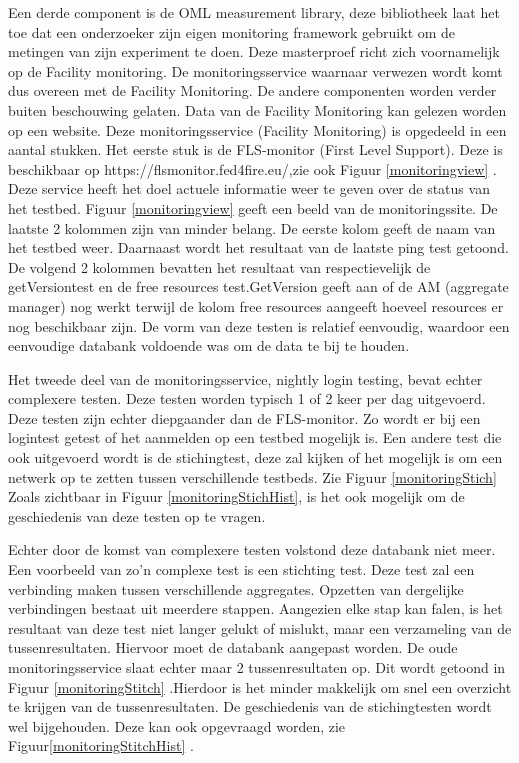 \npar
Een derde component is de OML measurement library, deze bibliotheek laat het toe dat een onderzoeker zijn eigen monitoring framework gebruikt om de metingen van zijn experiment te doen.
\npar
Deze masterproef richt zich voornamelijk op de Facility monitoring. De monitoringsservice waarnaar verwezen wordt komt dus overeen met de Facility Monitoring. De andere componenten worden verder buiten beschouwing gelaten.
Data van de Facility Monitoring kan gelezen worden op een website.
\npar
Deze monitoringsservice (Facility Monitoring) is opgedeeld in een aantal stukken. Het eerste stuk is de FLS-monitor (First Level Support). Deze is beschikbaar op https://flsmonitor.fed4fire.eu/,zie ook Figuur \ref{monitoringview} . Deze service heeft het doel actuele informatie weer te geven over de status van het testbed.
\npar
Figuur \ref{monitoringview} geeft een beeld van de monitoringssite. De laatste 2 kolommen zijn van minder belang. De eerste kolom geeft de naam van het testbed weer. Daarnaast wordt het resultaat van de laatste ping test getoond. De volgend 2 kolommen bevatten het resultaat van respectievelijk de getVersiontest en de free resources test.GetVersion geeft aan of de AM (aggregate manager) nog werkt terwijl de kolom free resources aangeeft hoeveel resources er nog beschikbaar zijn. De vorm van deze testen is relatief eenvoudig, waardoor een eenvoudige databank voldoende was om de data te bij te houden. 

\clearpage
\npar
Het tweede deel van de monitoringsservice, nightly login testing, bevat echter complexere testen. Deze testen worden typisch 1 of 2 keer per dag uitgevoerd. Deze testen zijn echter diepgaander dan de FLS-monitor. Zo wordt er bij een logintest getest of het aanmelden op een testbed mogelijk is. Een andere test die ook uitgevoerd wordt is de stichingtest, deze zal kijken of het mogelijk is om een netwerk op te zetten tussen verschillende testbeds. Zie Figuur \ref{monitoringStich}
Zoals zichtbaar in Figuur \ref{monitoringStichHist}, is het ook mogelijk om de geschiedenis van deze testen op te vragen. 
\clearpage




\npar
Echter door de komst van complexere testen volstond deze databank niet meer. Een voorbeeld van zo'n complexe test is een stichting test. Deze test zal een verbinding maken tussen verschillende aggregates. Opzetten van dergelijke verbindingen bestaat uit meerdere stappen. Aangezien elke stap kan falen, is het resultaat van deze test niet langer gelukt of mislukt, maar een verzameling van de tussenresultaten. Hiervoor moet de databank aangepast worden. De oude monitoringsservice slaat echter maar 2 tussenresultaten op. Dit wordt getoond in Figuur \ref{monitoringStitch} .Hierdoor is het minder makkelijk om snel een overzicht te krijgen van de tussenresultaten. De geschiedenis van de stichingtesten wordt wel bijgehouden. Deze kan ook opgevraagd worden, zie Figuur\ref{monitoringStitchHist} .


